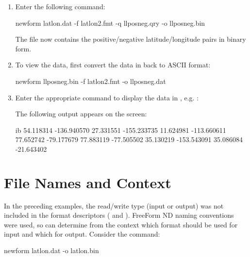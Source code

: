 \begin{enumerate}
\item Enter the following command: 

\begin{example}
newform latlon.dat -f latlon2.fmt -q llposneg.qry  
       -o llposneg.bin 
\end{example}

The  file now contains the positive/negative
latitude/longitude pairs in binary form.

\item To view the data, first convert the data in 
  back to ASCII format:

newform llposneg.bin -f latlon2.fmt -o llposneg.dat 

\item Enter the appropriate command to display the data in
  , e.g. :
  
  The following output appears on the screen:

\begin{vcode}{ib}
54.118314 -136.940570
27.331551 -155.233735
11.624981 -113.660611
77.652742  -79.177679
77.883119  -77.505502
35.130219 -153.543091
35.086084  -21.643402
\end{vcode}

\end{enumerate}

\section{File Names and Context}
\label{ff,fmtconv,filenames}

In the preceding examples, the read/write type (input or output) was
not included in the format descriptors ( and
). FreeForm ND naming conventions were used, so
 can determine from the context which format should be
used for input and which for output. Consider the command:

\begin{example}
newform latlon.dat -o latlon.bin 
\end{example}

